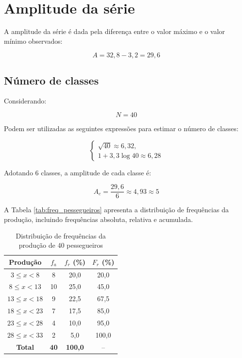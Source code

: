 \documentclass[a4paper,12pt]{article}
\begin{document}
\section{Amplitude da série}

A amplitude da série é dada pela diferença entre o valor máximo e o valor mínimo observados:

\[
A = 32,8 - 3,2 = 29,6
\]

\subsection{Número de classes}

Considerando:

\[
N = 40
\]

Podem ser utilizadas as seguintes expressões para estimar o número de classes:

\[
\begin{cases}
\sqrt{40} \approx 6,32, \\
1 + 3,3\log 40 \approx 6,28
\end{cases}
\]

Adotando 6 classes, a amplitude de cada classe é:

\[
A_c = \frac{29,6}{6} \approx 4,93 \approx 5
\]

A Tabela \ref{tab:freq_pessegueiros} apresenta a distribuição de frequências da produção, incluindo frequências absoluta, relativa e acumulada.

\begin{table}[htbp]
    \centering
    \caption{Distribuição de frequências da produção de 40 pessegueiros}
    \label{tab:distribuicao_frequencias}
    \begin{tabular}{cccc}
        \toprule
        \textbf{Produção} &
        \textbf{$f_a$} &
        \textbf{$f_r$ (\%)} &
        \textbf{$F_r$ (\%)} \\
        \midrule
        $3 \leq x < 8$   & 8  & 20,0 & 20,0  \\
        $8 \leq x < 13$  & 10 & 25,0 & 45,0  \\
        $13 \leq x < 18$ & 9  & 22,5 & 67,5  \\
        $18 \leq x < 23$ & 7  & 17,5 & 85,0  \\
        $23 \leq x < 28$ & 4  & 10,0 & 95,0  \\
        $28 \leq x < 33$ & 2  & 5,0  & 100,0 \\
        \midrule
        \textbf{Total} & \textbf{40} & \textbf{100,0} & -- \\
        \bottomrule
    \end{tabular}
\end{table}
\end{document}
